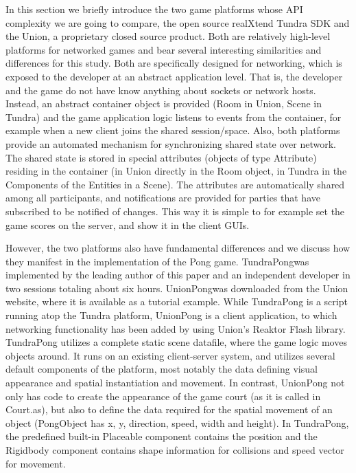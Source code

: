 \documentclass[conference]{IEEEtran}
\begin{document}
In this section we briefly introduce the two game platforms whose API
complexity we are going to compare, the open source realXtend Tundra
SDK \cite{Alatalo2011} and the Union, a proprietary closed source
product\footnotemark[1]. Both are relatively high-level
platforms for networked games and bear several interesting
similarities and differences for this study. Both are specifically
designed for networking, which is exposed to the developer at an
abstract application level. That is, the developer and the game do not
have know anything about sockets or network hosts. Instead, an
abstract container object is provided (Room in Union, Scene in Tundra)
and the game application logic listens to events from the container,
for example when a new client joins the shared session/space. Also,
both platforms provide an automated mechanism for synchronizing shared
state over network. The shared state is stored in special attributes
(objects of type Attribute) residing in the container (in Union
directly in the Room object, in Tundra in the Components of the
Entities in a Scene). The attributes are automatically shared among
all participants, and notifications are provided for parties that have
subscribed to be notified of changes. This way it is simple to for
example set the game scores on the server, and show it in the client
GUIs.


However, the two platforms also have fundamental differences and we
discuss how they manifest in the implementation of the Pong
game. TundraPong\footnotemark[2] was implemented by the leading author of this
paper and an independent developer in two sessions totaling about six
hours. UnionPong\footnotemark[3] was downloaded from the Union website, where it
is available as a tutorial example. While TundraPong is a script
running atop the Tundra platform, UnionPong is a client application,
to which networking functionality has been added by using Union's
Reaktor Flash library. TundraPong utilizes a complete static scene
datafile, where the game logic moves objects around. It runs on an
existing client-server system, and utilizes several default components
of the platform, most notably the data defining visual appearance and
spatial instantiation and movement. In contrast, UnionPong not only
has code to create the appearance of the game court (as it is called
in Court.as), but also to define the data required for the spatial
movement of an object (PongObject has x, y, direction, speed, width
and height). In TundraPong, the predefined built-in Placeable
component contains the position and the Rigidbody component contains
shape information for collisions and speed vector for movement.
\end{document}

